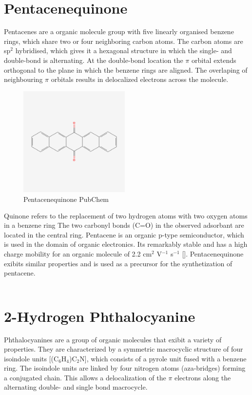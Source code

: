 \section{Pentacenequinone}
Pentacenes are a organic molecule group with five linearly organised benzene rings, which share two or four neighboring carbon atoms.
The carbon atoms are sp$^2$ hybridised, which gives it a hexagonal structure in which the single- and double-bond is alternating.
At the double-bond location the $\pi$ orbital extends orthogonal to the plane in which the benzene rings are aligned.
The overlaping of neighbouring $\pi$ orbitals results in delocalized electrons across the molecule. \\
\begin{figure}
    \centering
    \includegraphics[width=0.49\textwidth]{graphics/6,13-Pentacenequinone.png}
    \caption{Pentacenequinone PubChem \cite{pentacenequinone}}
    \label{fig:penta}
\end{figure}
\noindent Quinone refers to the replacement of two hydrogen atoms with two oxygen atoms in a benzene ring %
The two carbonyl bonds (C=O) in the observed adsorbant are located in the central ring.
Pentacene is an organic p-type semiconductor, which is used in the domain of organic electronics.
Its remarkably stable and has a high charge mobility for an organic molecule of 2.2 cm$^2$ V$^{-1}$ s$^{-1}$ [\cite{MOTA2018511}].
Pentacenequinone exibits similar properties and is used as a precursor for the synthetization of pentacene. \\
\\

\section{2-Hydrogen Phthalocyanine}
Phthalocyanines are a group of organic molecules that exibit a variety of properties.
They are characterized by a symmetric macrocyclic structure of four isoindole units [(C$_6$H$_4$)C$_2$N], which consists of a pyrole unit fused with a benzene ring. 
The isoindole units are linked by four nitrogen atoms (aza-bridges) forming a conjugated chain.
This allows a delocalization of the $\pi$ electrons along the alternating double- and single bond macrocycle.



